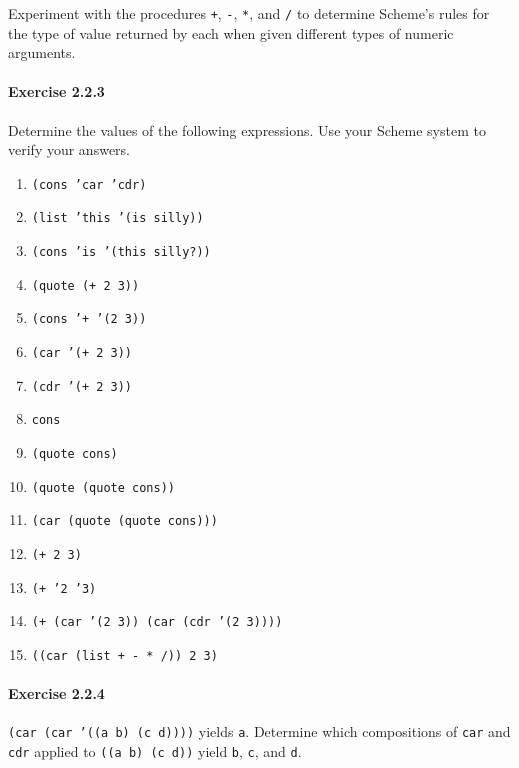 \label{start_s35}Experiment with the procedures \texttt{+}, \texttt{-}, \texttt{*}, and \texttt{/}
to determine Scheme's rules for the type of value returned by
each when given different types of numeric arguments.




\paragraph{Exercise \label{start_g9}2.2.3}


\label{start_s36}\label{start_EXEXPRVALUE}Determine the values of the following expressions.
Use your Scheme system to verify your answers.


 
 \begin{enumerate}[\it a. ]
\item \texttt{(cons 'car 'cdr)}
\item \texttt{(list 'this '(is silly))}
\item \texttt{(cons 'is '(this silly?))}
\item \texttt{(quote (+ 2 3))}
\item \texttt{(cons '+ '(2 3))}
\item \texttt{(car '(+ 2 3))}
\item \texttt{(cdr '(+ 2 3))}
\item \texttt{cons}
\item \texttt{(quote cons)}
\item \texttt{(quote (quote cons))}
\item \texttt{(car (quote (quote cons)))}
\item \texttt{(+ 2 3)}
\item \texttt{(+ '2 '3)}
\item \texttt{(+ (car '(2 3)) (car (cdr '(2 3))))}
\item \texttt{((car (list + - * /)) 2 3)}
\end{enumerate}




\paragraph{Exercise \label{start_g10}2.2.4}


\label{start_s37}\texttt{(car (car '((a b) (c d))))} yields \texttt{a}.
Determine which compositions of \texttt{car} and \texttt{cdr} applied
to \texttt{((a b) (c d))} yield \texttt{b}, \texttt{c}, and
\texttt{d}.




